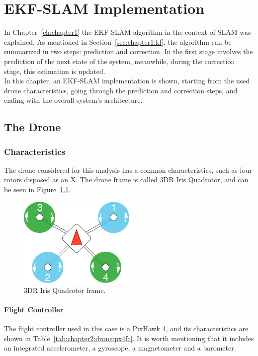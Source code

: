 \chapter{EKF-SLAM Implementation}
\label{ch:chapter2}
In Chapter~\ref{ch:chapter1} the EKF-SLAM algorithm in the context of SLAM was explained. As mentioned in Section~\ref{sec:chapter1:kf}, the algorithm can be summarized in two steps: prediction and correction. In the first stage involves the prediction of the next state of the system, meanwhile, during the correction stage, this estimation is updated. \\

In this chapter, an EKF-SLAM implementation is shown, starting from the used drone characteristics, going through the prediction and correction steps, and ending with the overall system's architecture.

\section{The Drone}
\label{sec:chapter2:drone}
\subsection{Characteristics}
\label{subsec:chapter2:drone:characteristics}
The drone considered for this analysis has a common characteristics, such as four rotors disposed as an X. The drone frame is called 3DR Iris Quadrotor, and can be seen in Figure~\ref{fig:chapter2:drone:frame}.

\begin{figure}
    \centering
    \includegraphics[width=0.5\textwidth]{Images/fig4-quad-frame.png}
    \caption{3DR Iris Quadrotor frame.}
    \label{fig:chapter2:drone:frame}
\end{figure}

\subsubsection{Flight Controller}
The flight controller used in this case is a PixHawk 4, and its characteristics are shown in Table~\ref{tab:chapter2:drone:px4fc}. It is worth mentioning that it includes an integrated accelerometer, a gyroscope, a magnetometer and a barometer.

